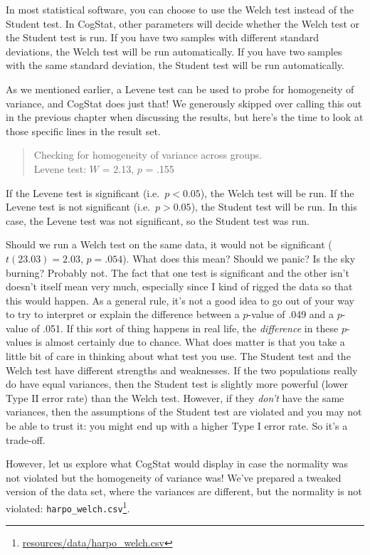 \documentclass[
  11pt,
  a4paper,
  twoside,symmetric,openright]{book}
\theoremstyle{break}
\theoremstyle{break}
\DeclareRobustCommand{\href}[2]{#2\footnote{\url{#1}}}
\begin{document}
In most statistical software, you can choose to use the Welch test instead of the Student test. In CogStat, other parameters will decide whether the Welch test or the Student test is run. If you have two samples with different standard deviations, the Welch test will be run automatically. If you have two samples with the same standard deviation, the Student test will be run automatically.

As we mentioned earlier, a Levene test can be used to probe for homogeneity of variance, and CogStat does just that! We generously skipped over calling this out in the previous chapter when discussing the results, but here's the time to look at those specific lines in the result set.

\begin{quote}
Checking for homogeneity of variance across groups.\\
Levene test: \(W\) = 2.13, \(p\) = .155
\end{quote}

If the Levene test is significant (i.e.~\(p < 0.05\)), the Welch test will be run. If the Levene test is not significant (i.e.~\(p > 0.05\)), the Student test will be run. In this case, the Levene test was not significant, so the Student test was run.

Should we run a Welch test on the same data, it would not be significant (\(t(23.03) = 2.03\), \(p = .054\)). What does this mean? Should we panic? Is the sky burning? Probably not. The fact that one test is significant and the other isn't doesn't itself mean very much, especially since I kind of rigged the data so that this would happen. As a general rule, it's not a good idea to go out of your way to try to interpret or explain the difference between a \(p\)-value of .049 and a \(p\)-value of .051. If this sort of thing happens in real life, the \emph{difference} in these \(p\)-values is almost certainly due to chance. What does matter is that you take a little bit of care in thinking about what test you use. The Student test and the Welch test have different strengths and weaknesses. If the two populations really do have equal variances, then the Student test is slightly more powerful (lower Type II error rate) than the Welch test. However, if they \emph{don't} have the same variances, then the assumptions of the Student test are violated and you may not be able to trust it: you might end up with a higher Type I error rate. So it's a trade-off.

However, let us explore what CogStat would display in case the normality was not violated but the homogeneity of variance was! We've prepared a tweaked version of the data set, where the variances are different, but the normality is not violated: \href{resources/data/harpo_welch.csv}{\texttt{harpo\_welch.csv}}.
\end{document}
